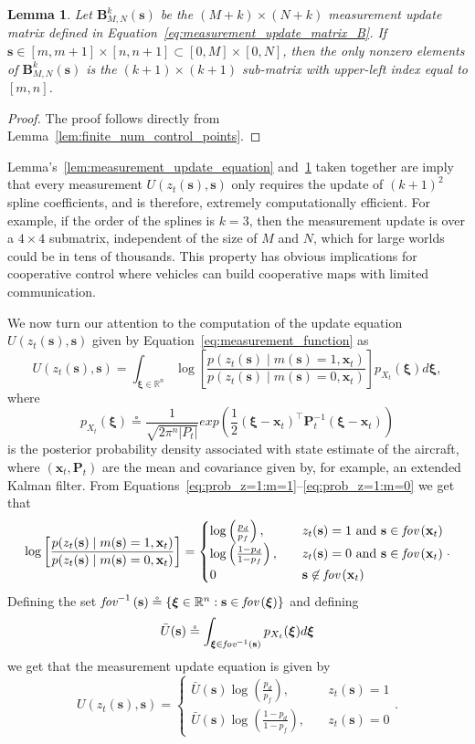 \documentclass{article}
\newtheorem{lemma}[theorem]{Lemma}
\newcommand{\defeq}{\circeq}
\newcommand{\fov}[1]{\text{\em fov}\left(#1\right)}
\newcommand{\fovinv}[1]{\text{\em fov}^{-1}\left(#1\right)}
\newcommand{\sbf}{\mathbf{s}}
\newcommand{\xbf}{\mathbf{x}}
\newcommand{\Pbf}{\mathbf{P}}
\newcommand{\xibf}{\boldsymbol{\xi}}
\begin{document}
\begin{lemma} \label{lem:B_is_sparse}
Let $\mathbf{B}_{M,N}^k(\sbf)$
be the $(M+k)\times(N+k)$ measurement update matrix defined in Equation~\eqref{eq:measurement_update_matrix_B}.  
If $\sbf \in [m, m+1]\times[n, n+1] \subset [0, M]\times[0,N]$, then the only nonzero elements of $\mathbf{B}_{M,N}^k(\sbf)$ is the $(k+1)\times(k+1)$ sub-matrix with upper-left index equal to $[m,n]$.
\end{lemma}
\begin{proof}
The proof follows directly from Lemma~\ref{lem:finite_num_control_points}.	
\end{proof}

Lemma's~\ref{lem:measurement_update_equation} and~\ref{lem:B_is_sparse} taken together are imply that every measurement $U(z_t(\sbf), \sbf)$ only requires the update of $(k+1)^2$ spline coefficients, and is therefore, extremely computationally efficient.  For example, if the order of the splines is $k=3$, then the measurement update is over a $4\times 4$ submatrix, independent of the size of $M$ and $N$, which for large worlds could be in tens of thousands.  This property has obvious implications for cooperative control where vehicles can build cooperative maps with limited communication.  


We now turn our attention to the computation of the update equation $U(z_t(\sbf), \sbf)$ given by Equation~\eqref{eq:measurement_function} as
\[
U(z_t(\sbf), \sbf) = \int_{\xibf\in\mathbb{R}^n}\log\left[ \frac{p(z_t(\sbf)\mid m(\sbf)=1, \xbf_t)}{p(z_t(\sbf)\mid m(\sbf)=0, \xbf_t)}\right]p_{X_t}(\xibf)d\xibf,
\]
where 
\[
p_{X_t}(\xibf) \defeq \frac{1}{\sqrt{2\pi^n|P_t|}}exp\left(\frac{1}{2}(\xibf-\xbf_t)^\top \Pbf_t^{-1} (\xibf-\xbf_t)\right)
\]
is the posterior probability density associated with state estimate of the aircraft, where $(\xbf_t, \Pbf_t)$ are the mean and covariance given by, for example, an extended Kalman filter.
From Equations~\eqref{eq:prob_z=1:m=1}--\eqref{eq:prob_z=1:m=0} we get that 
\[
\log\left[ \frac{p(z_t(\sbf)\mid m(\sbf)=1, \xbf_t)}{p(z_t(\sbf)\mid m(\sbf)=0, \xbf_t)}\right] 
	= \begin{cases}
 		\log\left(\frac{p_d}{p_f}\right), &\quad z_t(\sbf)=1 \text{~and~} \sbf\in\fov{\xbf_t} \\
 		\log\left(\frac{1-p_d}{1-p_f}\right), &\quad z_t(\sbf)=0 \text{~and~} \sbf\in\fov{\xbf_t} \\
 		0 &\quad \sbf\not\in\fov{\xbf_t}
 	  \end{cases}.
\]
Defining the set $\fovinv{\sbf}\defeq\{\xibf\in\mathbb{R}^n: \sbf\in\fov{\xibf}\}$ and defining 
\begin{equation}\label{eq:Ubar}
\bar{U}(\sbf) \defeq \int_{\xibf\in\fovinv{\sbf}} p_{X_t}(\xibf)d\xibf
\end{equation}
we get that the measurement update equation is given by
\[
U(z_t(\sbf), \sbf) = 
	\begin{cases}
 		\bar{U}(\sbf)\log\left(\frac{p_d}{p_f}\right), &\quad z_t(\sbf)=1 \\
 		\bar{U}(\sbf)\log\left(\frac{1-p_d}{1-p_f}\right), &\quad z_t(\sbf)=0
 	  \end{cases}.
\]
\end{document}
